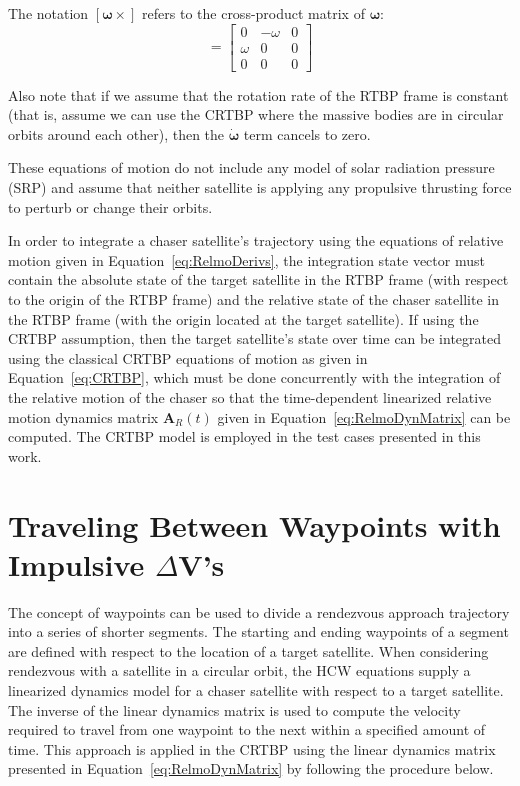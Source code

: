 \documentclass[letterpaper, preprint, paper,11pt]{AAS}	%
\begin{document}
The notation  \([\boldsymbol{\omega}\times]\) refers to the cross-product matrix of \(\boldsymbol{\omega}\):
\begin{equation}
	[\boldsymbol{\omega}\times] = \begin{bmatrix}
		0           & -\omega & 0 \\ 
		\omega & 0             & 0 \\
		0           & 0             & 0
	\end{bmatrix}
\end{equation}

Also note that if we assume that the rotation rate of the RTBP frame is constant (that is, assume we can use the CRTBP where the massive bodies are in circular orbits around each other), then the \(\boldsymbol{\dot{\omega}}\) term cancels to zero.

These equations of motion do not include any model of solar radiation pressure (SRP) and assume that neither satellite is applying any propulsive thrusting force to perturb or change their orbits. 

In order to integrate a chaser satellite's trajectory using the equations of relative motion given in Equation~\eqref{eq:RelmoDerivs}, the integration state vector must contain the absolute state of the target satellite in the RTBP frame (with respect to the origin of the RTBP frame) and the relative state of the chaser satellite in the RTBP frame (with the origin located at the target satellite).  If using the CRTBP assumption, then the target satellite's state over time can be integrated using the classical CRTBP equations of motion as given in Equation~\eqref{eq:CRTBP}, which must be done concurrently with the integration of the relative motion of the chaser so that the time-dependent linearized relative motion dynamics matrix \(\mathbf{A}_R(t)\) given in Equation~\eqref{eq:RelmoDynMatrix} can be computed. The CRTBP model is employed in the test cases presented in this work.

\section{Traveling Between Waypoints with Impulsive $\Delta$V's}
The concept of waypoints can be used to divide a rendezvous approach trajectory into a series of shorter segments.  The starting and ending waypoints of a segment are defined with respect to the location of a target satellite.  When considering rendezvous with a satellite in a circular orbit, the HCW equations supply a linearized dynamics model for a chaser satellite with respect to a target satellite.  The inverse of the linear dynamics matrix is used to compute the velocity required to travel from one waypoint to the next within a specified amount of time.  This approach is applied in the CRTBP using the linear dynamics matrix presented in Equation~\eqref{eq:RelmoDynMatrix} by following the procedure below. 
\end{document}
